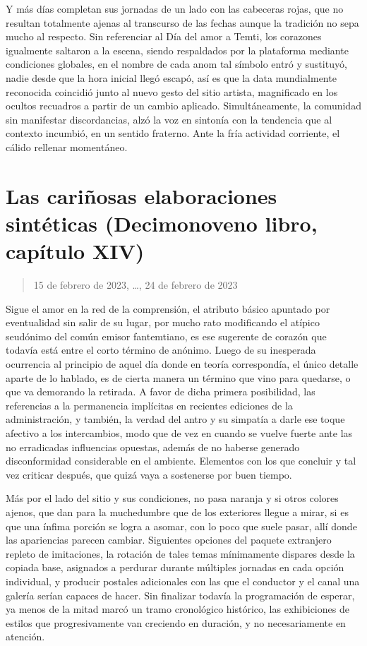 \documentclass[
]{book}
\begin{document}
Y más días completan sus jornadas de un lado con las cabeceras rojas, que no resultan totalmente ajenas al transcurso de las fechas aunque la tradición no sepa mucho al respecto. Sin referenciar al Día del amor a Temti, los corazones igualmente saltaron a la escena, siendo respaldados por la plataforma mediante condiciones globales, en el nombre de cada anom tal símbolo entró y sustituyó, nadie desde que la hora inicial llegó escapó, así es que la data mundialmente reconocida coincidió junto al nuevo gesto del sitio artista, magnificado en los ocultos recuadros a partir de un cambio aplicado. Simultáneamente, la comunidad sin manifestar discordancias, alzó la voz en sintonía con la tendencia que al contexto incumbió, en un sentido fraterno. Ante la fría actividad corriente, el cálido rellenar momentáneo.

\hypertarget{las-cariuxf1osas-elaboraciones-sintuxe9ticas-decimonoveno-libro-capuxedtulo-xiv}{%
\section{Las cariñosas elaboraciones sintéticas (Decimonoveno libro, capítulo XIV)}\label{las-cariuxf1osas-elaboraciones-sintuxe9ticas-decimonoveno-libro-capuxedtulo-xiv}}

\begin{quote}
15 de febrero de 2023, \ldots, 24 de febrero de 2023
\end{quote}

Sigue el amor en la red de la comprensión, el atributo básico apuntado por eventualidad sin salir de su lugar, por mucho rato modificando el atípico seudónimo del común emisor fantemtiano, es ese sugerente de corazón que todavía está entre el corto término de anónimo. Luego de su inesperada ocurrencia al principio de aquel día donde en teoría correspondía, el único detalle aparte de lo hablado, es de cierta manera un término que vino para quedarse, o que va demorando la retirada. A favor de dicha primera posibilidad, las referencias a la permanencia implícitas en recientes ediciones de la administración, y también, la verdad del antro y su simpatía a darle ese toque afectivo a los intercambios, modo que de vez en cuando se vuelve fuerte ante las no erradicadas influencias opuestas, además de no haberse generado disconformidad considerable en el ambiente. Elementos con los que concluir y tal vez criticar después, que quizá vaya a sostenerse por buen tiempo.

Más por el lado del sitio y sus condiciones, no pasa naranja y si otros colores ajenos, que dan para la muchedumbre que de los exteriores llegue a mirar, si es que una ínfima porción se logra a asomar, con lo poco que suele pasar, allí donde las apariencias parecen cambiar. Siguientes opciones del paquete extranjero repleto de imitaciones, la rotación de tales temas mínimamente dispares desde la copiada base, asignados a perdurar durante múltiples jornadas en cada opción individual, y producir postales adicionales con las que el conductor y el canal una galería serían capaces de hacer. Sin finalizar todavía la programación de esperar, ya menos de la mitad marcó un tramo cronológico histórico, las exhibiciones de estilos que progresivamente van creciendo en duración, y no necesariamente en atención.
\end{document}
